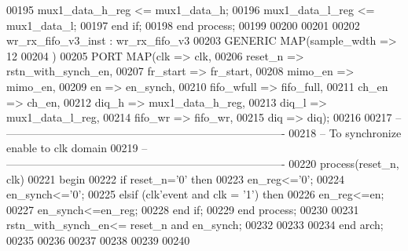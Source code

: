 \begin{DoxyCode}
00195         \textcolor{vhdlchar}{mux1_data_h_reg} \textcolor{vhdlchar}{<=} \textcolor{vhdlchar}{mux1_data_h};
00196         \textcolor{vhdlchar}{mux1_data_l_reg} \textcolor{vhdlchar}{<=} \textcolor{vhdlchar}{mux1_data_l};
00197     \textcolor{keywordflow}{end} \textcolor{keywordflow}{if};
00198 \textcolor{keywordflow}{end} \textcolor{keywordflow}{process};          
00199 
00200 
00201 
00202 wr_rx_fifo_v3_inst : wr_rx_fifo_v3
00203 \textcolor{keywordflow}{GENERIC} \textcolor{keywordflow}{MAP}(sample_wdth => \textcolor{vhdllogic}{12}
00204             \textcolor{vhdlchar}{)}
00205 \textcolor{keywordflow}{PORT} \textcolor{keywordflow}{MAP}(clk        => clk,
00206          reset_n    => rstn_with_synch_en,
00207          fr_start   => fr_start,
00208          mimo_en    => mimo_en,
00209          en             => en_synch,
00210          fifo_wfull => fifo_full,
00211          ch_en      => ch_en,
00212          diq_h      => mux1_data_h_reg,
00213          diq_l      => mux1_data_l_reg,
00214          fifo_wr    => fifo_wr,
00215          diq            => diq\textcolor{vhdlchar}{)};
00216 
00217 \textcolor{keyword}{-- ----------------------------------------------------------------------------}
00218 \textcolor{keyword}{-- To synchronize enable to clk domain}
00219 \textcolor{keyword}{-- ----------------------------------------------------------------------------}
00220   \textcolor{keywordflow}{process}(reset_n, clk)
00221 \textcolor{vhdlkeyword}{    begin}
00222       \textcolor{keywordflow}{if} \textcolor{vhdlchar}{reset_n}\textcolor{vhdlchar}{=}\textcolor{vhdlchar}{'}\textcolor{vhdllogic}{}\textcolor{vhdllogic}{0}\textcolor{vhdlchar}{'} \textcolor{keywordflow}{then}
00223         \textcolor{vhdlchar}{en_reg}\textcolor{vhdlchar}{<=}\textcolor{vhdlchar}{'}\textcolor{vhdllogic}{}\textcolor{vhdllogic}{0}\textcolor{vhdlchar}{'};
00224             \textcolor{vhdlchar}{en_synch}\textcolor{vhdlchar}{<=}\textcolor{vhdlchar}{'}\textcolor{vhdllogic}{}\textcolor{vhdllogic}{0}\textcolor{vhdlchar}{'}; 
00225       \textcolor{keywordflow}{elsif} \textcolor{vhdlchar}{(}\textcolor{vhdlchar}{clk}\textcolor{vhdlchar}{'}\textcolor{vhdlkeyword}{event} \textcolor{keywordflow}{and} \textcolor{vhdlchar}{clk} \textcolor{vhdlchar}{=} \textcolor{vhdlchar}{'}\textcolor{vhdllogic}{}\textcolor{vhdllogic}{1}\textcolor{vhdlchar}{'}\textcolor{vhdlchar}{)} \textcolor{keywordflow}{then}
00226         \textcolor{vhdlchar}{en_reg}\textcolor{vhdlchar}{<=}\textcolor{vhdlchar}{en};
00227             \textcolor{vhdlchar}{en_synch}\textcolor{vhdlchar}{<=}\textcolor{vhdlchar}{en_reg}; 
00228         \textcolor{keywordflow}{end} \textcolor{keywordflow}{if};
00229     \textcolor{keywordflow}{end} \textcolor{keywordflow}{process};
00230  
00231 \textcolor{vhdlchar}{rstn_with_synch_en}\textcolor{vhdlchar}{<=} \textcolor{vhdlchar}{reset_n} \textcolor{keywordflow}{and}  \textcolor{vhdlchar}{en_synch};
00232 
00233 
00234 \textcolor{keywordflow}{end} \textcolor{vhdlchar}{arch};   
00235 
00236 
00237 
00238 
00239 
00240 
\end{DoxyCode}
